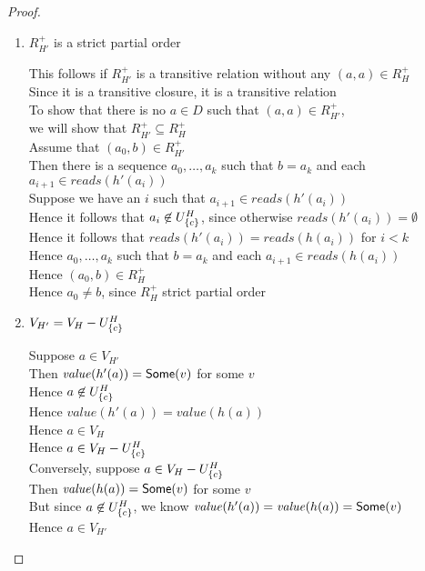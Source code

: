 \begin{proof}
\begin{enumerate}
\item $R^+_{H'}$ is a strict partial order 
  \begin{tabbedproof}
    \oo This follows if $R^+_{H'}$ is a transitive relation without any $(a,a) \in R^+_H$ \\
    \oo Since it is a transitive closure, it is a transitive relation \\
    \oo To show that there is no $a \in D$ such that $(a,a) \in R^+_{H'}$, \\
    \ox we will show that $R^+_{H'} \subseteq R^+_H$ \\
    \oo Assume that $(a_0,b) \in R^+_{H'}$ \\
    \oo Then there is a sequence $a_0, \ldots, a_k$ such that $b = a_k$ and each $a_{i+1} \in \mathit{reads}(h'(a_i))$ \\
    \oo Suppose we have an $i$ such that $a_{i+1} \in \mathit{reads}(h'(a_i))$ \\
    \oo Hence it follows that $a_i \not\in U^H_{\{{c}\}}$, since otherwise $\mathit{reads}(h'(a_i)) = \emptyset$ \\
    \oo Hence it follows that $\mathit{reads}(h'(a_i)) = \mathit{reads}(h(a_i))$ for $i < k$ \\
    \oo Hence $a_0, \ldots, a_k$ such that $b = a_k$ and each $a_{i+1} \in \mathit{reads}(h(a_i))$ \\
    \oo Hence $(a_0, b) \in R^+_H$ \\
    \oo Hence $a_0 \not= b$, since $R^+_H$ strict partial order 
  \end{tabbedproof}

\item $V_{H'} = V_H - U^H_{\{{c}\}}$
  \begin{tabbedproof}
    \oo Suppose $a \in V_{H'}$ \\
    \ooo Then $\mathit{value}(h'(a)) = \mathsf{Some}(v)$ for some $v$ \\
    \ooo Hence $a \not\in U^H_{\{{c}\}}$ \\
    \ooo Hence $\mathit{value}(h'(a)) = \mathit{value}(h(a))$  \\
    \ooo Hence $a \in V_H$ \\
    \ooo Hence $a \in V_{H} - U^H_{\{{c}\}}$ \\
    \oo Conversely, suppose $a \in V_{H} - U^H_{\{{c}\}}$ \\
    \ooo Then $\mathit{value}(h(a)) = \mathsf{Some}(v)$ for some $v$ \\
    \ooo But since $a \not\in U^H_{\{{c}\}}$, we know $\mathit{value}(h'(a)) = \mathit{value}(h(a)) = \mathsf{Some}(v)$ \\
    \ooo Hence $a \in V_{H'}$ 
  \end{tabbedproof}


\end{enumerate}
\end{proof}

